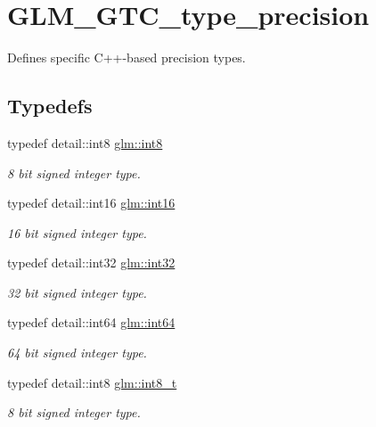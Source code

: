 \hypertarget{group__gtc__type__precision}{\section{G\-L\-M\-\_\-\-G\-T\-C\-\_\-type\-\_\-precision}
\label{group__gtc__type__precision}
}


Defines specific C++-\/based precision types.  


\subsection*{Typedefs}
\begin{DoxyCompactItemize}
\item 
typedef detail\-::int8 \hyperlink{group__gtc__type__precision_ga96254f9c1c4506fc8eb5cf3301ce8565}{glm\-::int8}
\begin{DoxyCompactList}\small\item\em 8 bit signed integer type. \end{DoxyCompactList}\item 
typedef detail\-::int16 \hyperlink{group__gtc__type__precision_ga2945a61d12771f8954994fcddf02b021}{glm\-::int16}
\begin{DoxyCompactList}\small\item\em 16 bit signed integer type. \end{DoxyCompactList}\item 
typedef detail\-::int32 \hyperlink{group__gtc__type__precision_ga632d8b25f6b61659f39ea4321fab92a4}{glm\-::int32}
\begin{DoxyCompactList}\small\item\em 32 bit signed integer type. \end{DoxyCompactList}\item 
typedef detail\-::int64 \hyperlink{group__gtc__type__precision_ga435d75819cce297cc5fa21bd84ef89a5}{glm\-::int64}
\begin{DoxyCompactList}\small\item\em 64 bit signed integer type. \end{DoxyCompactList}\item 
typedef detail\-::int8 \hyperlink{group__gtc__type__precision_ga673898d450b2a91186f3c4f40c5f8633}{glm\-::int8\-\_\-t}
\begin{DoxyCompactList}\small\item\em 8 bit signed integer type. \end{DoxyCompactList}\item 

\end{DoxyCompactItemize}
